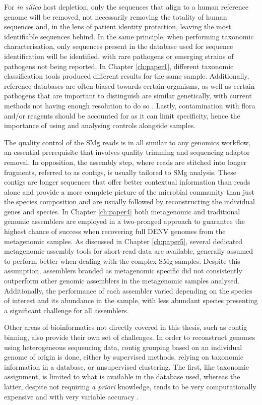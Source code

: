 For \textit{in silico} host depletion, only the sequences that align to a human reference genome will be removed, not necessarily removing the totality of human sequences and, in the lens of patient identity protection, leaving the most identifiable sequences behind. In the same principle, when performing taxonomic characterisation, only sequences present in the database used for sequence identification will be identified, with rare pathogens or emerging strains of pathogens not being reported. In Chapter \ref{ch:paper1}, different taxonomic classification tools produced different results for the same sample. Additionally, reference databases are often biased towards certain organisms, as well as certain pathogens that are important to distinguish are similar genetically, with current methods not having enough resolution to do so \citep{gu_clinical_2019}. Lastly, contamination with flora and/or reagents should be accounted for as it can limit specificity, hence the importance of using and analysing controls alongside samples. 

The quality control of the \ac{SMg} reads is in all similar to any genomics workflow, an essential prerequisite that involves quality trimming and sequencing adaptor removal. In opposition, the assembly step, where reads are stitched into longer fragments, referred to as contigs, is usually tailored to \ac{SMg} analysis. These contigs are longer sequences that offer better contextual information than reads alone and provide a more complete picture of the microbial community than just the species composition and are usually followed by reconstructing the individual genes and species. In Chapter \ref{ch:paper4} both metagenomic and traditional genomic assemblers are employed in a two-pronged approach to guarantee the highest chance of success when recovering full \ac{DENV} genomes from the metagenomic samples. As discussed in Chapter \ref{ch:paper5}, several dedicated metagenomic assembly tools for short-read data are available, generally assumed to perform better when dealing with the complex \ac{SMg} samples. Despite this assumption, assemblers branded as metagenomic specific did not consistently outperform other genomic assemblers in the metagenomic samples analysed. Additionally, the performance of each assembler varied depending on the species of interest and its abundance in the sample, with less abundant species presenting a significant challenge for all assemblers.

Other areas of bioinformatics not directly covered in this thesis, such as contig binning, also provide their own set of challenges. In order to reconstruct genomes using heterogeneous sequencing data, contig grouping based on an individual genome of origin is done, either by supervised methods, relying on taxonomic information in a database, or unsupervised clustering. The first, like taxonomic assignment, is limited  to what is available in the database used, whereas the latter, despite not requiring \textit{a priori} knowledge, tends to be very computationally expensive and with very variable accuracy \citep{bharti_current_2021}. 

